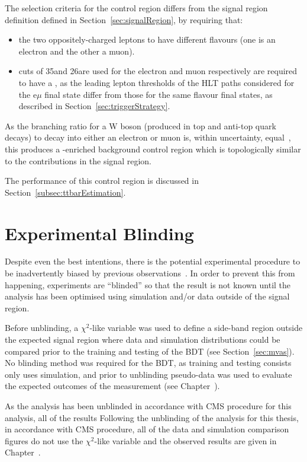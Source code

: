 The selection criteria for the \ttbar control region differs from the signal region definition defined in Section~\ref{sec:signalRegion}, by requiring that:
\begin{itemize}
\item the two oppositely-charged leptons to have different flavours (\ie one is an electron and the other a muon).
\item \pt cuts of 35\GeV and 26\GeV are used for the electron and muon respectively are required to have a , as the leading lepton \pt thresholds of the HLT paths considered for the e$\mu$ final state differ from those for the same flavour final states, as described in Section~\ref{sec:triggerStrategy}. 
\end{itemize} 

As the branching ratio for a W boson (produced in top and anti-top quark decays) to decay into either an electron or muon is, within uncertainty, equal~\cite{Tanabashi:2018oca}, this produces a \ttbar-enriched background control region which is topologically similar to the \ttbar contributions in the signal region. 

The performance of this control region is discussed in Section~\ref{subsec:ttbarEstimation}.

\section{Experimental Blinding}\label{sec:blinding}
Despite even the best intentions, there is the potential experimental procedure to be inadvertently biased by previous observations~\cite{Roodman:2003rw}.
In order to prevent this from happening, experiments are ``blinded'' so that the result is not known until the analysis has been optimised using simulation and/or data outside of the signal region.

Before unblinding, a $\chi^{2}$-like variable was used to define a side-band region outside the expected signal region where data and simulation distributions could be compared prior to the training and testing of the BDT (see Section~\ref{sec:mvas}).
No blinding method was required for the BDT, as training and testing consists only uses simulation, and prior to unblinding pseudo-data was used to evaluate the expected outcomes of the measurement (see Chapter~\cite{chapter:results}).

As the analysis has been unblinded in accordance with CMS procedure for this analysis, all of the results 
Following the unblinding of the analysis for this thesis, in accordance with CMS procedure, all of the data and simulation comparison figures do not use the $\chi^{2}$-like variable and the observed results are given in Chapter~\cite{chapter:results}.

